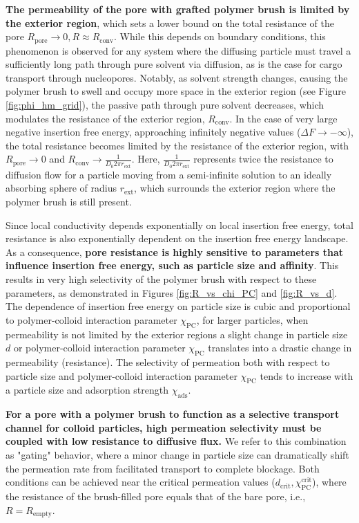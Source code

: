 \documentclass[12pt, a4paper]{article}
\begin{document}
\textbf{The permeability of the pore with grafted polymer brush is limited by the exterior region}, which sets a lower bound on the total resistance of the pore $R_{\text{pore}} \to 0 , R \approx R_{\text{conv}}$.
While this depends on boundary conditions, this phenomenon is observed for any system where the diffusing particle must travel a sufficiently long path through pure solvent via diffusion, as is the case for cargo transport through nucleopores.%
Notably, as solvent strength changes, causing the polymer brush to swell and occupy more space in the exterior region (see Figure \ref{fig:phi_hm_grid}), the passive path through pure solvent decreases, which modulates the resistance of the exterior region, $R_{\text{conv}}$.
In the case of very large negative insertion free energy, approaching infinitely negative values ($\Delta F \to -\infty$), the total resistance becomes limited by the resistance of the exterior region, with $R_{\text{pore}} \to 0$ and $R_{\text{conv}} \to \frac{1}{D_0 2 \pi r_{\text{ext}}}$.
Here, $\frac{1}{D_0 2 \pi r_{\text{ext}}}$ represents twice the resistance to diffusion flow for a particle moving from a semi-infinite solution to an ideally absorbing sphere of radius $r_{\text{ext}}$, which surrounds the exterior region where the polymer brush is still present.

Since local conductivity depends exponentially on local insertion free energy, total resistance is also exponentially dependent on the insertion free energy landscape.
As a consequence, \textbf{pore resistance is highly sensitive to parameters that influence insertion free energy, such as particle size and affinity}.
This results in very high selectivity of the polymer brush with respect to these parameters, as demonstrated in Figures \ref{fig:R_vs_chi_PC} and \ref{fig:R_vs_d}.
The dependence of insertion free energy on particle size is cubic and proportional to polymer-colloid interaction parameter $\chi_{\text{PC}}$, for larger particles, when permeability is not limited by the exterior regions a slight change in particle size $d$ or polymer-colloid interaction parameter $\chi_{\text{PC}}$ translates into a drastic change in permeability (resistance).
The selectivity of permeation both with respect to particle size and polymer-colloid interaction parameter $\chi_{\text{PC}}$ tends to increase with a particle size and adsorption strength $\chi_{\text{ads}}$.

\textbf{For a pore with a polymer brush to function as a selective transport channel for colloid particles, high permeation selectivity must be coupled with low resistance to diffusive flux.}
We refer to this combination as "gating" behavior, where a minor change in particle size can dramatically shift the permeation rate from facilitated transport to complete blockage.
Both conditions can be achieved near the critical permeation values ($d_{\text{crit}}, \chi_{\text{PC}}^{\text{crit}}$), where the resistance of the brush-filled pore equals that of the bare pore, i.e., $R = R_{\text{empty}}$.
\end{document}
